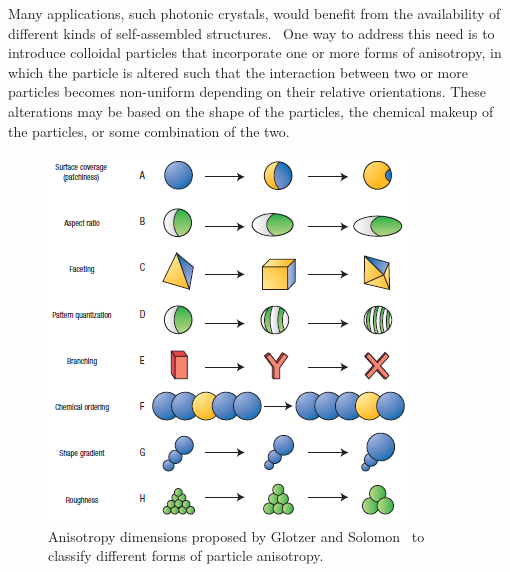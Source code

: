 Many applications, such photonic crystals, would benefit from the availability of different
kinds of self-assembled structures.~\cite{glotzer-solomon}  One way to address this need is to 
introduce colloidal particles that incorporate one or more forms of anisotropy, in which the 
particle is altered such that the interaction between two or more particles becomes non-uniform depending on 
their relative orientations.  These alterations may be based on the shape of the particles, the chemical makeup
of the particles, or 
some combination of the two.

\begin{figure}[h]
\begin{center}
\includegraphics{figures/glotzer-anisotropy-dimensions.png}
\end{center}
\caption{Anisotropy dimensions proposed by Glotzer and Solomon~\cite{glotzer-solomon} to classify 
different forms of particle anisotropy.}
\label{fig:glotzer-dimensions}
\end{figure}



